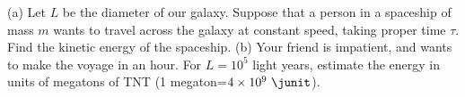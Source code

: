 (a) Let $L$ be the diameter of our galaxy. Suppose that a person in a spaceship of mass $m$ wants
to travel across the galaxy at constant speed, taking proper time $\tau$. Find the kinetic
energy of the spaceship. (b) Your friend is impatient, and wants to make the voyage in
an hour. For $L=10^5$ light years, estimate the energy in units of megatons of TNT
(1 megaton=$4\times10^9\ \junit$).
